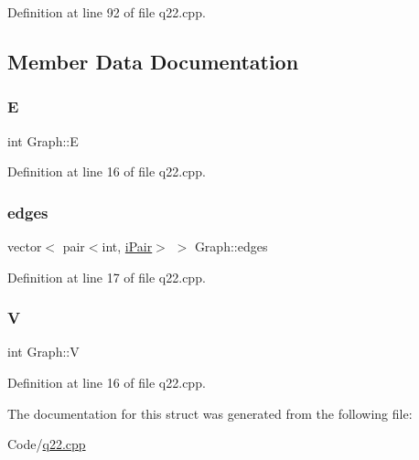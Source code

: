 Definition at line 92 of file q22.\+cpp.



\subsection{Member Data Documentation}
\mbox{\label{struct_graph_a3ce250f958f7e96ffd9eb06780c21fbe}} 
\subsubsection{\texorpdfstring{E}{E}}
{\footnotesize\ttfamily int Graph\+::E}



Definition at line 16 of file q22.\+cpp.

\mbox{\label{struct_graph_a6694959510dc3092c7a02efa56ed7a8f}} 
\subsubsection{\texorpdfstring{edges}{edges}}
{\footnotesize\ttfamily vector$<$ pair$<$int, \hyperlink{q22_8cpp_a18fc5862b3095bd9855a9e15c67b392d}{i\+Pair}$>$ $>$ Graph\+::edges}



Definition at line 17 of file q22.\+cpp.

\mbox{\label{struct_graph_a2b722f7cfa7a21e4cb5fae488b3d4dcc}} 
\subsubsection{\texorpdfstring{V}{V}}
{\footnotesize\ttfamily int Graph\+::V}



Definition at line 16 of file q22.\+cpp.



The documentation for this struct was generated from the following file\+:\begin{DoxyCompactItemize}
\item 
Code/\hyperlink{q22_8cpp}{q22.\+cpp}\end{DoxyCompactItemize}
